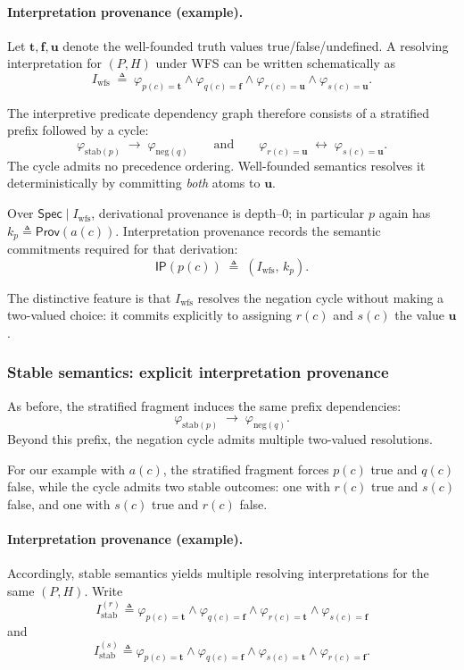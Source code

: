\documentclass[acmsmall,nonacm]{acmart}
\theoremstyle{remark}
\numberwithin{definition}{section}
\numberwithin{theorem}{section}
\numberwithin{lemma}{section}
\numberwithin{corollary}{section}
\numberwithin{remark}{section}
\numberwithin{example}{section}
\numberwithin{observation}{section}
\numberwithin{assumption}{section}
\newcommand{\Spec}{\mathsf{Spec}}
\newcommand{\Prov}{\mathsf{Prov}}
\begin{document}
\paragraph{Interpretation provenance (example).}
Let $\mathbf{t},\mathbf{f},\mathbf{u}$ denote the well-founded truth values
true/false/undefined.
A resolving interpretation for $(P,H)$ under WFS can be written schematically as
\[
  I_{\mathrm{wfs}} \;\triangleq\;
  \varphi_{p(c)=\mathbf{t}} \wedge \varphi_{q(c)=\mathbf{f}}
  \wedge \varphi_{r(c)=\mathbf{u}} \wedge \varphi_{s(c)=\mathbf{u}} .
\]

The interpretive predicate dependency graph therefore consists of a stratified
prefix followed by a cycle:
\[
  \varphi_{\mathrm{stab}(p)} \;\rightarrow\; \varphi_{\mathrm{neg}(q)}
  \qquad\text{and}\qquad
  \varphi_{r(c)=\mathbf{u}} \;\leftrightarrow\; \varphi_{s(c)=\mathbf{u}} .
\]
The cycle admits no precedence ordering.
Well-founded semantics resolves it deterministically by committing \emph{both}
atoms to $\mathbf{u}$.

Over $\Spec \mid I_{\mathrm{wfs}}$, derivational provenance is depth--0; in
particular $p$ again has
$k_p \triangleq \Prov(a(c))$.
Interpretation provenance records the semantic commitments required for that
derivation:
\[
  \mathsf{IP}(p(c)) \;\triangleq\; (I_{\mathrm{wfs}},\, k_p) .
\]

The distinctive feature is that $I_{\mathrm{wfs}}$ resolves the negation cycle
without making a two-valued choice: it commits explicitly to assigning $r(c)$ and $s(c)$
the value $\mathbf{u}$.

\subsubsection{Stable semantics: explicit interpretation provenance}

As before, the stratified fragment induces the same prefix dependencies:
\[
  \varphi_{\mathrm{stab}(p)} \;\rightarrow\; \varphi_{\mathrm{neg}(q)}.
\]
Beyond this prefix, the negation cycle admits multiple two-valued resolutions.

For our example with $a(c)$, the stratified fragment forces $p(c)$ true and $q(c)$ false,
while the cycle admits two stable outcomes: one with $r(c)$ true and $s(c)$ false, and
one with $s(c)$ true and $r(c)$ false.

\paragraph{Interpretation provenance (example).}
Accordingly, stable semantics yields multiple resolving interpretations for the
same $(P,H)$.
Write
\[
  I_{\mathrm{stab}}^{(r)} \triangleq
  \varphi_{p(c)=\mathbf{t}} \wedge \varphi_{q(c)=\mathbf{f}}
  \wedge \varphi_{r(c)=\mathbf{t}} \wedge \varphi_{s(c)=\mathbf{f}}
\]
and
\[
  I_{\mathrm{stab}}^{(s)} \triangleq
  \varphi_{p(c)=\mathbf{t}} \wedge \varphi_{q(c)=\mathbf{f}}
  \wedge \varphi_{s(c)=\mathbf{t}} \wedge \varphi_{r(c)=\mathbf{f}} .
\]
\end{document}
